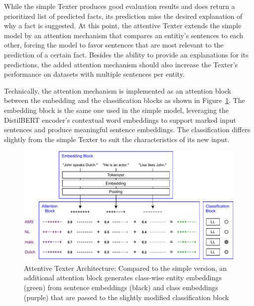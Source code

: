While the simple Texter produces good evaluation results and does return a prioritized list of predicted facts, its prediction miss the desired explanation of why a fact is suggested. At this point, the attentive Texter extends the simple model by an attention mechanism that compares an entitiy's sentences to each other, forcing the model to favor sentences that are most relevant to the prediction of a certain fact. Besides the ability to provide an explanations for its predictions, the added attention mechanism should also increase the Texter's performance on datasets with multiple sentences per entity.

Technically, the attention mechanism is implemented as an attention block between the embedding and the classification blocks as shown in Figure~\ref{fig:4_approach/1_texter/2_attention_model/attention_architecture}. The embedding block is the same one used in the simple model, leveraging the DistilBERT encoder's contextual word embeddings to support marked input sentences and produce meaningful sentence embeddings. The classification differs slightly from the simple Texter to suit the characteristics of its new input.

\begin{figure}[t]
    \centering
    \includegraphics{4_approach/1_texter/2_attention_model/attention_architecture}
    \caption{Attentive Texter Architecture: Compared to the simple version, an additional attention block generates class-wise entity embeddings (green) from sentence embeddings (black) and class embeddings (purple) that are passed to the slightly modified classification block}
    \label{fig:4_approach/1_texter/2_attention_model/attention_architecture}
\end{figure}

